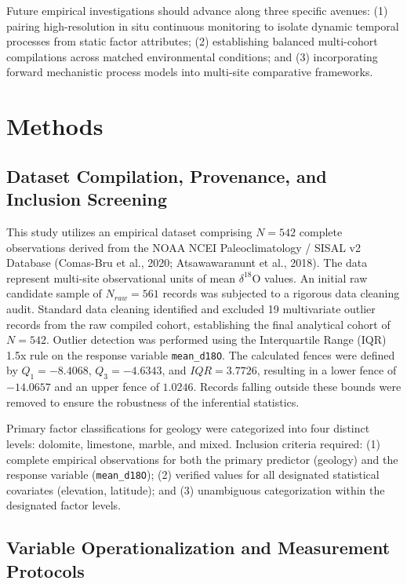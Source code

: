 \documentclass[sn-basic,Numbered]{sn-jnl}%
\begin{document}
Future empirical investigations should advance along three specific avenues: (1) pairing high-resolution in situ continuous monitoring to isolate dynamic temporal processes from static factor attributes; (2) establishing balanced multi-cohort compilations across matched environmental conditions; and (3) incorporating forward mechanistic process models into multi-site comparative frameworks.

\section{Methods}
\label{sec:methods}
\subsection{Dataset Compilation, Provenance, and Inclusion Screening}

This study utilizes an empirical dataset comprising $N = 542$ complete observations derived from the NOAA NCEI Paleoclimatology / SISAL v2 Database (Comas-Bru et al., 2020; Atsawawaranunt et al., 2018). The data represent multi-site observational units of mean $\delta^{18}$O values. An initial raw candidate sample of $N_{raw} = 561$ records was subjected to a rigorous data cleaning audit. Standard data cleaning identified and excluded 19 multivariate outlier records from the raw compiled cohort, establishing the final analytical cohort of $N = 542$. Outlier detection was performed using the Interquartile Range (IQR) 1.5x rule on the response variable \texttt{mean\_d18O}. The calculated fences were defined by $Q_1 = -8.4068$, $Q_3 = -4.6343$, and $IQR = 3.7726$, resulting in a lower fence of $-14.0657$ and an upper fence of $1.0246$. Records falling outside these bounds were removed to ensure the robustness of the inferential statistics.

Primary factor classifications for geology were categorized into four distinct levels: dolomite, limestone, marble, and mixed. Inclusion criteria required: (1) complete empirical observations for both the primary predictor (geology) and the response variable (\texttt{mean\_d18O}); (2) verified values for all designated statistical covariates (elevation, latitude); and (3) unambiguous categorization within the designated factor levels.

\subsection{Variable Operationalization and Measurement Protocols}
\end{document}

